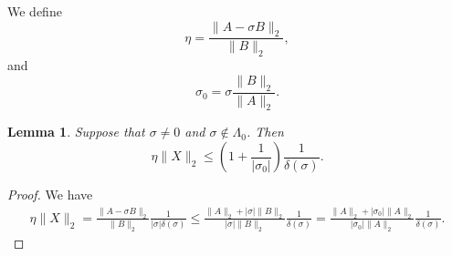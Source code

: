 \documentclass[12pt]{article}
\newtheorem{lemma}{Lemma}
\begin{document}
We define
\begin{equation}
  \label{eq:eta_def}
  \eta = \frac{\|A-\sigma B\|_2}{\|B\|_2},
\end{equation}
and
\begin{equation}
  \label{eq:sigma0_def}
  \sigma_0 = \sigma \frac{\|B\|_2}{\|A\|_2}.
\end{equation}
\begin{lemma}
  \label{lm:eta_X_bound}
  Suppose that $\sigma\neq 0$ and $\sigma \notin \Lambda_0$.  Then
  \begin{equation*}
    \eta \|X\|_2 \leq \left(1 + \frac{1}{|\sigma_0|}\right)
    \frac{1}{\delta(\sigma)}.
  \end{equation*}
\end{lemma}
\begin{proof}
  We have
  \begin{multline*}
    \eta \|X\|_2
    = \frac{\|A-\sigma B\|_2}{\|B\|_2} \frac{1}{|\sigma| \delta(\sigma)}
    \leq \frac{\|A\|_2+|\sigma| \|B\|_2}{|\sigma|\|B\|_2} \frac{1}{\delta(\sigma)}
    = \frac{\|A\|_2+|\sigma_0| \|A\|_2}{|\sigma_0|\|A\|_2} \frac{1}{\delta(\sigma)}.
  \end{multline*}
\end{proof}
\end{document}
